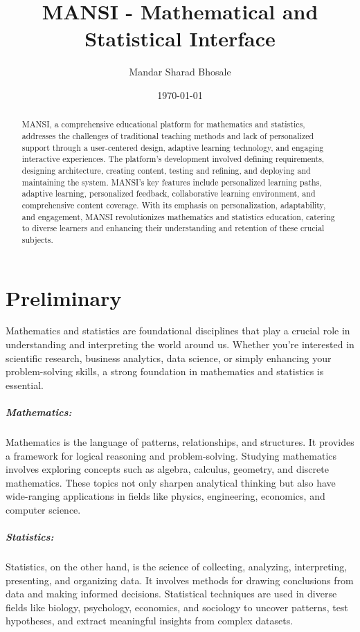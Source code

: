 \documentclass[20pt]{report}
\title{\huge \textbf{MANSI - Mathematical and Statistical Interface}}
\author{\Large Mandar Sharad Bhosale}
\date{\today}
\begin{document}
\maketitle
\tableofcontents

\listoffigures
\listoftables
\begin{abstract}
   MANSI, a comprehensive educational platform for mathematics and statistics, addresses the challenges of traditional teaching methods and lack of personalized support through a user-centered design, adaptive learning technology, and engaging interactive experiences. The platform's development involved defining requirements, designing architecture, creating content, testing and refining, and deploying and maintaining the system. MANSI's key features include personalized learning paths, adaptive learning, personalized feedback, collaborative learning environment, and comprehensive content coverage. With its emphasis on personalization, adaptability, and engagement, MANSI revolutionizes mathematics and statistics education, catering to diverse learners and enhancing their understanding and retention of these crucial subjects.
\end{abstract}
\chapter{Preliminary}
Mathematics and statistics are foundational disciplines that play a crucial role in understanding and interpreting the world around us. Whether you're interested in scientific research, business analytics, data science, or simply enhancing your problem-solving skills, a strong foundation in mathematics and statistics is essential.
\paragraph{Mathematics:}Mathematics is the language of patterns, relationships, and structures. It provides a framework for logical reasoning and problem-solving. Studying mathematics involves exploring concepts such as algebra, calculus, geometry, and discrete mathematics. These topics not only sharpen analytical thinking but also have wide-ranging applications in fields like physics, engineering, economics, and computer science.

\paragraph{Statistics:}Statistics, on the other hand, is the science of collecting, analyzing, interpreting, presenting, and organizing data. It involves methods for drawing conclusions from data and making informed decisions. Statistical techniques are used in diverse fields like biology, psychology, economics, and sociology to uncover patterns, test hypotheses, and extract meaningful insights from complex datasets.
\end{document}
